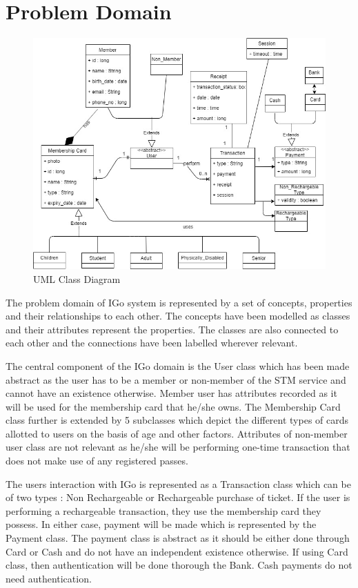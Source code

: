 \documentclass[12pt]{report}
\begin{document}
\chapter{Problem Domain}
\begin{figure}[htb]

\begin{center}
\includegraphics[scale=0.54]{./DomainModel}
\end{center}
\caption{UML Class Diagram}
\end{figure}
The problem domain of IGo system is represented by a set of concepts, properties and their relationships to each other. The concepts have been modelled as classes and their attributes represent the properties. The classes are also connected to each other and the connections have been labelled wherever relevant.

The central component of the IGo domain is the User class which has been made abstract as the user has to be a member or non-member of the STM service and cannot have an existence otherwise. Member user has attributes recorded as it will be used for the membership card that he/she owns. The Membership Card class further is extended by 5 subclasses which depict the different types of cards allotted to users on the basis of age and other factors. Attributes of non-member user class are not relevant as he/she will be performing one-time transaction that does not make use of any registered passes.

The users interaction with IGo is represented as a Transaction  class which can be of two types : Non Rechargeable or Rechargeable purchase of ticket. If the user is performing a rechargeable transaction, they use the membership card they possess. In either case, payment will be made which is represented by the Payment class. The payment class is abstract as it should be either done through Card or Cash and do not have an independent existence otherwise. If using Card class, then authentication will be done thorough the Bank. Cash payments do not need authentication.
\end{document}
